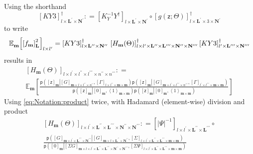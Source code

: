 \documentclass[preprint,12pt]{elsarticle}
\newcommand*{\M}[1]{\ensuremath{#1}\xspace}
\newcommand*{\x}{\times}
\newcommand*{\mi}[1]{\mathbf{#1}}
\newcommand*{\rv}[1]{\mathsf{#1}}
\newcommand*{\te}[2][]{\left\lbrack{#2}\right\rbrack_{#1}}
\newcommand*{\diag}[2][]{\left\langle{#2}\right\rangle_{#1}}
\newcommand*{\prob}[3]{\M{\mathsf{p}\!\left(\left.{#1}\right\vert{#2,#3}\right)}}
\newcommand*{\deq}{\M{\mathrel{\mathop:}=}}
\newcommand*{\ev}[3][]{\mathbb{E}_{#3}^{#1}\!\left\lbrack{#2}\right\rbrack}
\newcommand*{\evt}[3][]{\mathbb{E}_{#3}^{#1}\!#2}
\newcommand*{\modulus}[1]{\M{\left\lvert{#1}\right\rvert}}
\begin{document}
        Using the shorthand
        \begin{equation*}
            \te[l\x\mi{L^{\prime}}\x\mi{N^{\prime}}]{KY3}^{\dagger} \deq \te[l\x\mi{L^{\prime}}\x\mi{N^{\prime}}]{K_{Y}^{-1} Y^{\dagger}} \circ \te[l\x\mi{L^{\prime}}\x 3 \x\mi{N^{\prime}}]{g({\rv{z}}; \Theta)}^{\dagger}
        \end{equation*}
        to write
        \begin{equation*}                
            \evt{\te[l\x l^{\prime}]{\te[\mi{L}]{f_{\mi{m}}}^{2}}}{\mi{m}} = \te[l\x\mi{L^{\prime\prime}}\x\mi{N^{\prime\prime}}]{KY3}^{\dagger} \\
            \te[l \x l^{\prime}\x\mi{L^{\prime\prime}}\x\mi{L^{\prime\prime\prime}}\x\mi{N^{\prime\prime}}\x\mi{N^{\prime\prime\prime}}]{H_{\mi{m}}(\Theta)}^{\dagger}
            \te[l^{\prime}\x\mi{L^{\prime\prime\prime}}\x\mi{N^{\prime\prime\prime}}]{KY3}^{\dagger}
        \end{equation*}
        results in
        \begin{multline*}
            \te[l \x l^{\prime}\x l^{\prime\prime}\x l^{\prime\prime\prime}\x n^{\prime\prime}\x n^{\prime\prime\prime}]{H_{\mi{m}}(\Theta)} \deq \\
            \ev{\frac{
                \prob{\te[\mi{m}]{\rv{z}}}{\te[\mi{m}\x l\x l^{\prime\prime}\x n^{\prime\prime}]{G}}{\te[l\x l^{\prime\prime}\x\mi{m}\x\mi{m}]{\Gamma}}
                \prob{\te[\mi{m}]{\rv{z}}}{\te[\mi{m}\x l^{\prime}\x l^{\prime\prime\prime}\x n^{\prime\prime\prime}]{G}}{\te[l^{\prime}\x l^{\prime\prime\prime}\x \mi{m}\x\mi{m}]{\Gamma}}}
            {\prob{\te[\mi{m}]{\rv{z}}}{\te[\mi{m}]{0}}{\diag[\mi{m\x m}]{1}}
            \prob{\te[\mi{m}]{\rv{z}}}{\te[\mi{m}]{0}}{\diag[\mi{m\x m}]{1}}}}{\mi{m}}
        \end{multline*}
        Using \cref{eq:Notation:product} twice, with Hadamard (element-wise) division and product
        \begin{multline*}
            \te[l \x l^{\prime}\x\mi{L^{\prime\prime}}\x\mi{L^{\prime\prime\prime}}\x\mi{N^{\prime\prime}}\x\mi{N^{\prime\prime\prime}}]{H_{\mi{m}}(\Theta)} \deq
            \te[l\x l^{\prime}\x \mi{L^{\prime\prime}}\x \mi{L^{\prime\prime\prime}}]{\modulus{\Psi}^{-1}} \circ \\
            \frac{
                \prob{\te[\mi{m}\x l^{\prime}\x\mi{L^{\prime\prime\prime}}\x\mi{N^{\prime\prime\prime}}]{G}}
                {\te[\mi{m}\x l\x\mi{L^{\prime\prime}}\x\mi{N^{\prime\prime}}]{G}}{\te[l \x l^{\prime}\x\mi{L^{\prime\prime}}\x\mi{L^{\prime\prime\prime}}\x\mi{m}\x\mi{m}]{\Sigma}}
                }
            {\prob{\te[\mi{m}]{0}}
            {\te[\mi{m}\x l \x l^{\prime}\x\mi{L^{\prime\prime}}\x\mi{L^{\prime\prime\prime}}\x\mi{N^{\prime\prime}}\x\mi{N^{\prime\prime\prime}}]{\Sigma G}}{\te[l \x l^{\prime}\x\mi{L^{\prime\prime}}\x\mi{L^{\prime\prime\prime}}\x\mi{m}\x\mi{m}]{\Sigma\Psi}}}
        \end{multline*}
\end{document}
